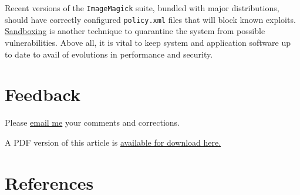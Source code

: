 \documentclass[
  11pt,
  british,
  a4paper,
]{article}
\begin{document}
Recent versions of the \texttt{ImageMagick} suite, bundled with major
distributions, should have correctly configured \texttt{policy.xml}
files that will block known exploits.
\href{https://www.techopedia.com/definition/25266/sandboxing}{Sandboxing}
is another technique to quarantine the system from possible
vulnerabilities. Above all, it is vital to keep system and application
software up to date to avail of evolutions in performance and security.

\hypertarget{feedback}{%
\section{Feedback}\label{feedback}}

Please \href{mailto:feedback.swanlotus@gmail.com}{email me} your
comments and corrections.

\noindent A PDF version of this article is
\href{./image-format-conversions.pdf}{available for download here.}

\hypertarget{bibliography}{%
\section*{References}\label{bibliography}}
\end{document}
